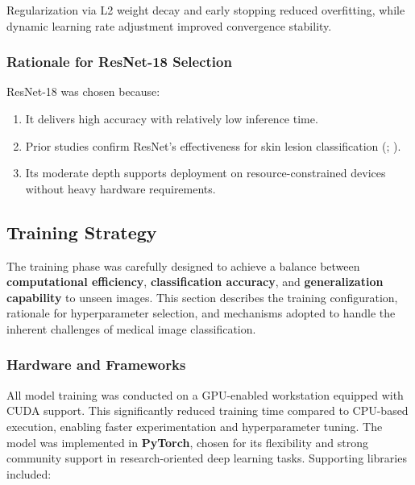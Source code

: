 \documentclass[
  12pt,
  oneside]{article}
\providecommand{\tightlist}{%
  \setlength{\itemsep}{0pt}\setlength{\parskip}{0pt}}
\begin{document}
Regularization via L2 weight decay and early stopping reduced
overfitting, while dynamic learning rate adjustment improved convergence
stability.

\subsubsection{Rationale for ResNet-18
Selection}\label{rationale-for-resnet-18-selection}

ResNet-18 was chosen because:

\begin{enumerate}
\def\labelenumi{\arabic{enumi}.}
\tightlist
\item
  It delivers high accuracy with relatively low inference time.
\item
  Prior studies confirm ResNet's effectiveness for skin lesion
  classification (;
  ).
\item
  Its moderate depth supports deployment on resource-constrained devices
  without heavy hardware requirements.
\end{enumerate}

\subsection{Training Strategy}\label{training-strategy}

The training phase was carefully designed to achieve a balance between
\textbf{computational efficiency}, \textbf{classification accuracy}, and
\textbf{generalization capability} to unseen images. This section
describes the training configuration, rationale for hyperparameter
selection, and mechanisms adopted to handle the inherent challenges of
medical image classification.

\subsubsection{Hardware and Frameworks}\label{hardware-and-frameworks}

All model training was conducted on a GPU-enabled workstation equipped
with CUDA support. This significantly reduced training time compared to
CPU-based execution, enabling faster experimentation and hyperparameter
tuning. The model was implemented in \textbf{PyTorch}, chosen for its
flexibility and strong community support in research-oriented deep
learning tasks. Supporting libraries included:
\end{document}
